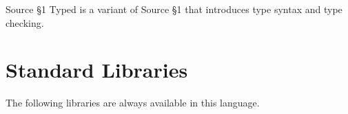 





Source \S 1 Typed is a variant of Source \S 1 that introduces type syntax and type checking.





\newpage





















\section{Standard Libraries}

The following libraries are always available in this language.








